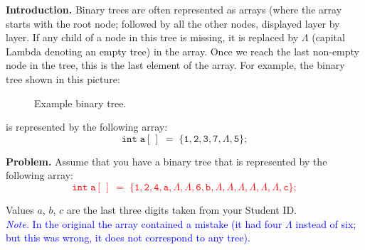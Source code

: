 \documentclass[a4paper,12pt]{article}
\begin{document}
{\footnotesize
{\bf Introduction.} 
Binary trees are often represented as arrays 
(where the array starts with the root node; followed
by all the other nodes, displayed layer by layer. 
If any child of a node in this tree is missing, it is replaced by 
$\Lambda$ (capital Lambda denoting an empty tree)
in the array. Once we reach the last non-empty node in the tree, this is
the last element of the array. 
For example, the binary tree shown in this picture:

\begin{figure}[!htb]
\caption{\label{fig:example-binary-tree} Example binary tree.}
\end{figure}
is represented by the following array: 
$$\mathtt{int\;a[\,]\;=\;\{1,2,3,7,\Lambda,5\}};$$

}

\vspace{10pt}
{\bf Problem.} 
Assume that you have a binary tree that is represented by the following array:
\textcolor{red}{
\begin{equation}
\label{eq:treearr}
\mathtt{int\;a[\,]\;=\;\{1, 2, 4, a, \Lambda, \Lambda, 6, b, \Lambda, \Lambda, \Lambda, \Lambda, \Lambda, \Lambda, c\};}
\end{equation}
}

Values $a$, $b$, $c$ are the last three digits taken from your Student ID.\\
\textcolor{blue}{\footnotesize
{\em Note.} In the original the array contained a mistake (it had four $\Lambda$ 
instead of six; but this was wrong, it does not correspond to any tree). 
}
\end{document}
